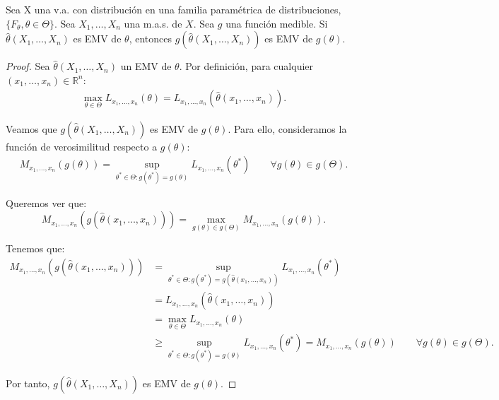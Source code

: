 \begin{teo}
    Sea X una v.a. con distribución en una familia paramétrica de distribuciones, $\{F_\theta, \theta \in \Theta\}$. Sea $X_1, \ldots, X_n$ una m.a.s. de $X$. Sea $g$ una función medible. Si $\hat{\theta}(X_1, \ldots, X_n)$ es EMV de $\theta$, entonces $g(\hat{\theta}(X_1, \ldots, X_n))$ es EMV de $g(\theta)$.
    \begin{proof}
        Sea $\hat{\theta}(X_1, \ldots, X_n)$ un EMV de $\theta$. Por definición, para cualquier $(x_1, \ldots, x_n) \in \mathbb{R}^n$:
        \begin{align*}
            \max_{\theta \in \Theta} L_{x_1, \ldots, x_n}(\theta) = L_{x_1, \ldots, x_n}(\hat{\theta}(x_1, \ldots, x_n)).
        \end{align*}

        Veamos que $g(\hat{\theta}(X_1, \ldots, X_n))$ es EMV de $g(\theta)$. Para ello, consideramos la función de verosimilitud respecto a $g(\theta)$:
        \begin{align*}
            M_{x_1, \ldots, x_n}(g(\theta)) = \sup_{\theta^* \in \Theta : g(\theta^*) = g(\theta)} L_{x_1, \ldots, x_n}(\theta^*) \qquad \forall g(\theta) \in g(\Theta).
        \end{align*}

        Queremos ver que:
        \begin{equation*}
            M_{x_1, \ldots, x_n}(g(\hat{\theta}(x_1, \ldots, x_n))) = \max_{g(\theta) \in g(\Theta)} M_{x_1, \ldots, x_n}(g(\theta)).
        \end{equation*}

        Tenemos que:
        \begin{align*}
            M_{x_1, \ldots, x_n}(g(\hat{\theta}(x_1, \ldots, x_n))) &= \sup_{\theta^* \in \Theta : g(\theta^*) = g(\hat{\theta}(x_1, \ldots, x_n))} L_{x_1, \ldots, x_n}(\theta^*) \\
            &= L_{x_1, \ldots, x_n}(\hat{\theta}(x_1, \ldots, x_n)) \\
            &= \max_{\theta \in \Theta} L_{x_1, \ldots, x_n}(\theta) \\
            &\geq \sup_{\theta^* \in \Theta : g(\theta^*) = g(\theta)} L_{x_1, \ldots, x_n}(\theta^*) = M_{x_1, \ldots, x_n}(g(\theta)) \qquad \forall g(\theta) \in g(\Theta).
        \end{align*}

        Por tanto, $g(\hat{\theta}(X_1, \ldots, X_n))$ es EMV de $g(\theta)$.
    \end{proof}
\end{teo}


